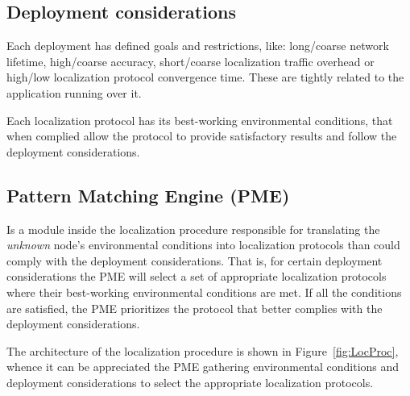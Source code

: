 \subsection{Deployment considerations}\label{deploymentConsiderations}
Each deployment has defined goals and restrictions, like: long/coarse network lifetime, high/coarse accuracy, short/coarse localization traffic overhead or high/low localization protocol convergence time. These are tightly related to the application running over it.

Each localization protocol has its best-working environmental conditions, that when complied allow the protocol to provide satisfactory results and follow the deployment considerations.

\subsection{Pattern Matching Engine (PME)}\label{PME}
Is a module inside the localization procedure responsible for translating the \emph{unknown} node's environmental conditions into localization protocols than could comply with the deployment considerations. That is, for certain deployment considerations the PME will select a set of appropriate localization protocols where their best-working environmental conditions are met. If all the conditions are satisfied, the PME prioritizes the protocol that better complies with the deployment considerations. 

The architecture of the localization procedure is shown in Figure~\ref{fig:LocProc}, whence it can be appreciated the PME gathering environmental conditions and deployment considerations to select the appropriate localization protocols.

